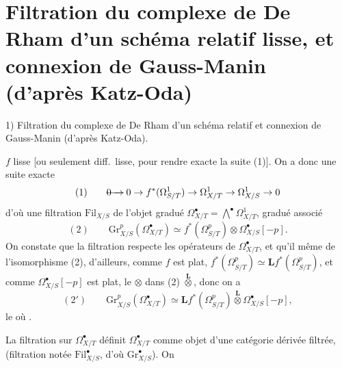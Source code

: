 \documentclass[11pt,a4paper]{article}
\begin{document}
\section{Filtration du complexe de De Rham d'un schéma relatif lisse, et connexion de Gauss-Manin (d'après Katz-Oda)}

1) Filtration du complexe de De Rham d'un schéma relatif et connexion de Gauss-Manin \struck{\ill{}} (d'après Katz-Oda).


$f$ lisse [ou seulement diff.\ lisse, pour rendre exacte la suite (1)]. On a donc une suite exacte
\[
(1) \qquad \text{\struck{$0 \to$}}\; 0 \to f^{*}(\Omega^{1}_{S/T}) \to \Omega^{1}_{X/T} \to \Omega^{1}_{X/S} \to 0
\]
d'où une filtration $\mathrm{Fil}_{X/S}$ de l'objet gradué $\Omega^{\bullet}_{X/T} = \bigwedge^{\bullet} \Omega^{1}_{X/T}$,  gradué associé
\[
(2) \qquad \mathrm{Gr}^{p}_{X/S}(\Omega^{\bullet}_{X/T}) \simeq f^{*}(\Omega^{p}_{S/T}) \otimes \Omega^{\bullet}_{X/S}[-p] .
\]
On constate que la filtration respecte les opérateurs  de $\Omega^{\bullet}_{X/T}$, et qu'il  même \ill{}  de l'isomorphisme (2), \ill{} d'ailleurs, comme $f$ est plat, $f^{*}(\Omega^{p}_{S/T}) \simeq \mathbf{L}f^{*}(\Omega^{p}_{S/T})$, et comme $\Omega^{\bullet}_{X/S}[-p]$ est plat, le $\otimes$ dans (2)    $\overset{\mathbf{L}}{\otimes}$, donc on a
\[
(2') \qquad \mathrm{Gr}^{p}_{X/S}(\Omega^{\bullet}_{X/T}) \simeq \mathbf{L}f^{*}(\Omega^{p}_{S/T}) \overset{\mathbf{L}}{\otimes} \Omega^{\bullet}_{X/S}[-p] ,
\]
 le   où \ill{}  \ill{}.

La filtration sur $\Omega^{\bullet}_{X/T}$ définit   \ill{} \ill{} \ill{} $\Omega^{\bullet}_{X/T}$ comme objet d'une catégorie dérivée filtrée, (filtration \ill{} notée $\mathrm{Fil}^{\bullet}_{X/S}$, d'où $\mathrm{Gr}^{\bullet}_{X/S}$). On
\end{document}
